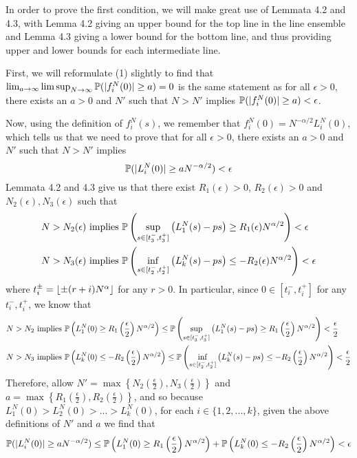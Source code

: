	In order to prove the first condition, we will make great use of Lemmata 4.2 and 4.3, with Lemma 4.2 giving an upper bound for the top line in the line ensemble and Lemma 4.3 giving a lower bound for the bottom line, and thus providing upper and lower bounds for each intermediate line.
	
	First, we will reformulate (1) slightly to find that $\lim_{a\to\infty}\limsup_{N\to\infty} \mathbb{P}(|f^N_i(0)|\geq a)=0$ is the same statement as for all $\epsilon>0$, there exists an $a>0$ and $N'$ such that $N>N'$ implies $\mathbb{P}(|f^N_i(0)|\geq a)<\epsilon$. 
	
	Now, using the definition of $f_i^N(s)$, we remember that $f^N_i(0)=N^{-\alpha/2}L_i^N(0)$, which tells us that we need to prove that for all $\epsilon>0$, there exists an $a>0$ and $N'$ such that $N>N'$ implies 
	$$\mathbb{P}(|L_i^N(0)|\geq a N^{-\alpha/2})<\epsilon$$
	Lemmata 4.2 and 4.3 give us that there exist $R_1(\epsilon)>0$, $R_2(\epsilon)>0$ and $N_2(\epsilon),N_3(\epsilon)$ such that 
	\begin{align*}
	N>N_2(\epsilon) &\text{ implies } \mathbb{P}\left(\sup_{s\in[t_3^-,t_3^+]}\left(L_1^N(s)-ps\right)\geq R_1(\epsilon)N^{\alpha/2}\right)<\epsilon\\
	N>N_3(\epsilon) &\text{ implies } \mathbb{P}\left(\inf_{s\in[t_2^-,t_2^+]}\left(L_k^N(s)-ps\right)\leq -R_2(\epsilon)N^{\alpha/2}\right)<\epsilon
	\end{align*}
	where $t_i^\pm=\lfloor\pm(r+i)N^\alpha\rfloor$ for any $r>0$. In particular, since $0\in[t_i^-,t_i^+]$ for any $t_i^-,t_i^+$, we know that 
	\begin{align*}
	N>N_2&\text{ implies }\mathbb{P}\left(L_1^N(0)\geq R_1\left(\frac{\epsilon}{2}\right)N^{\alpha/2}\right)\leq \mathbb{P}\left(\sup_{s\in[t_3^-,t_3^+]}\left(L_1^N(s)-ps\right)\geq R_1\left(\frac \epsilon 2\right)N^{\alpha/2}\right)<\frac\epsilon 2\\
	N>N_3&\text{ implies }\mathbb{P}\left(L_k^N(0)\leq -R_2\left(\frac{\epsilon}{2}\right)N^{\alpha/2}\right)\leq \mathbb{P}\left(\inf_{s\in[t_2^-,t_2^+]}\left(L_k^N(s)-ps\right)\leq -R_2\left(\frac\epsilon 2\right)N^{\alpha/2}\right)<\frac \epsilon 2
	\end{align*}
	Therefore, allow $N'=\max\left\{N_2\left(\frac{\epsilon}{2}\right),N_3\left(\frac{\epsilon}{2}\right)\right\}$ and $a=\max\left\{R_1\left(\frac{\epsilon}{2}\right),R_2\left(\frac{\epsilon}{2}\right)\right\}$, and so because $L_1^N(0)>L_2^N(0)>...>L_k^N(0)$, for each $i\in \{1,2,...,k\}$, given the above definitions of $N'$ and $a$ we find that 
	$$\mathbb{P}(|L_i^N(0)|\geq a N^{-\alpha/2})\leq \mathbb{P}\left(L_1^N(0)\geq R_1\left(\frac{\epsilon}{2}\right)N^{\alpha/2}\right)+\mathbb{P}\left(L_k^N(0)\leq -R_2\left(\frac{\epsilon}{2}\right)N^{\alpha/2}\right)<\epsilon$$
